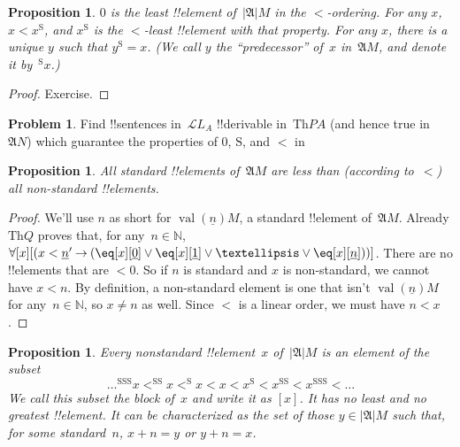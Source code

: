 \documentclass[10pt,a4paper]{article}
\makeatletter
\theoremstyle{plain}
\newtheorem{prop}[thm]{Proposition}
\theoremstyle{definition}
\newtheorem{prob}{Problem}[section]
\theoremstyle{remark}
\newcommand*{\ollabel}[1]{\label{#1}}
\newcommand{\olref}{\@ifnextchar[{\olref@i}{\olref@final}}
\def\olref@i[#1]{\@ifnextchar[{\olref@ii}{\olref@final}}
\def\olref@ii[#1]{\@ifnextchar[{\olref@iii}{\olref@final}}
\def\olref@iii[#1]{\olref@final}
\def\olref@final#1{\ref{#1}}
\providecommand{\lif}{\mathbin{\rightarrow}}
\providecommand{\lforall}{\mathord{\forall}}
\providecommand{\Struct}{\ensuremath{\mathfrak{A}}}
\providecommand{\Domain}{\ensuremath{|\mathfrak{A}|}}
\providecommand{\Lang}{\ensuremath{\mathcal{L}}}
\providecommand{\Th}{\ensuremath{\mathrm{Th}}}
\providecommand{\num}[1]{\underline{#1}}
\providecommand{\Nat}{\ensuremath{\mathbb{N}}}
\providecommand{\Value}[1]{\operatorname{val}(#1)}
\providecommand{\nszero}{\mathrm{0}}
\providecommand{\nssucc}{\mathrm{S}}
\providecommand{\nsplus}{\mathbin{+}}
\providecommand{\nsless}{<}
\makeatother
\begin{document}
\begin{prop}
\ollabel{prop:M-discrete} $\nszero$ is the least !!{element}
of~$\Domain{M}$ in the $\nsless$-ordering. For any $x$, $x \nsless
x^\nssucc$, and $x^\nssucc$ is the $\nsless$-least !!{element} with
that property.  For any $x$, there is a unique $y$ such that
$y^\nssucc = x$. (We call $y$ the ``predecessor'' of~$x$
in~$\Struct{M}$, and denote it by~$^\nssucc x$.)
\end{prop}

\begin{proof}
Exercise.  
\end{proof}

\begin{prob}
Find !!{sentence}s in~$\Lang{L_A}$ !!{derivable} in~$\Th{PA}$ (and
hence true in~$\Struct{N}$) which guarantee the properties of
$\nszero$, $\nssucc$, and $\nsless$ in
\olref[mod][mar][mpa]{prop:M-discrete}
\end{prob}

\begin{prop}
All standard !!{element}s of~$\Struct{M}$ are less than (according
to~$\nsless$) all non-standard !!{element}s.
\end{prop}

\begin{proof}
We'll use $n$ as short for $\Value{\num{n}}{M}$, a standard
!!{element} of~$\Struct{M}$.  Already $\Th{Q}$ proves that, for any~$n
\in \Nat$, $\lforall[x][(x < \num{n}' \lif (\eq[x][\num{0}] \lor
  \eq[x][\num{1}] \lor \dots \lor \eq[x][\num{n}]))]$. There are no
!!{element}s that are $\nsless \nszero$. So if $n$ is standard and $x$
is non-standard, we cannot have $x \nsless n$. By definition, a
non-standard element is one that isn't $\Value{\num{n}}{M}$ for any~$n
\in \Nat$, so $x \neq n$ as well. Since $\nsless$ is a linear order,
we must have $n \nsless x$.
\end{proof}

\begin{prop}
Every nonstandard !!{element}~$x$ of~$\Domain{M}$ is an element of the subset
\[
\dots ^{\nssucc\nssucc\nssucc}x \nsless ^{\nssucc\nssucc}x \nsless
^{\nssucc}x \nsless x \nsless x^{\nssucc} \nsless x^{\nssucc\nssucc}
\nsless x^{\nssucc\nssucc\nssucc} \nsless \dots
\]
We call this subset the \emph{block of~$x$} and write it as $[x]$. It
has no least and no greatest !!{element}. It can be characterized as
the set of those $y \in \Domain{M}$ such that, for some standard~$n$,
$x \nsplus n = y$ or $y \nsplus n = x$.
\end{prop}
\end{document}
